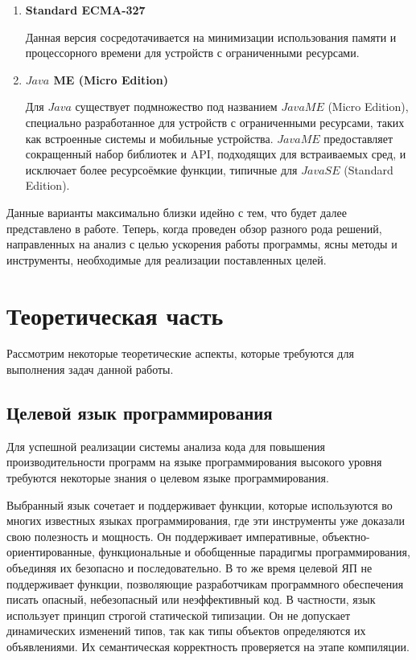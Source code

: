 \documentclass{mipt-thesis-bs}
\begin{document}
\begin{enumerate}
        \item \textbf{Standard ECMA-327}

        Данная версия сосредотачивается на минимизации использования памяти и
        процессорного времени для устройств с ограниченными ресурсами.

        \item \textbf{$Java$ ME (Micro Edition)}

        Для $Java$ существует подмножество под названием $Java ME$ (Micro Edition),
        специально разработанное для устройств с ограниченными ресурсами, таких
        как встроенные системы и мобильные устройства. $Java ME$ предоставляет
        сокращенный набор библиотек и API, подходящих для встраиваемых сред,
        и исключает более ресурсоёмкие функции, типичные для $Java SE$ (Standard Edition).
\end{enumerate}

Данные варианты максимально близки идейно с тем, что будет далее представлено в работе.
Теперь, когда проведен обзор разного рода решений, направленных на анализ с целью ускорения
работы программы, ясны методы и инструменты, необходимые для реализации поставленных целей.


\chapter{Теоретическая часть}

Рассмотрим некоторые теоретические аспекты, которые требуются для
выполнения задач данной работы.

\section{Целевой язык программирования}

Для успешной реализации системы анализа кода для повышения производительности программ на
языке программирования высокого уровня требуются некоторые знания о целевом языке программирования.

Выбранный язык сочетает и поддерживает функции, которые используются во многих известных
языках программирования, где эти инструменты уже доказали свою полезность и мощность.
Он поддерживает императивные, объектно-ориентированные, функциональные и обобщенные
 парадигмы программирования, объединяя их безопасно и последовательно.
В то же время целевой ЯП не поддерживает функции, позволяющие разработчикам
программного обеспечения писать опасный, небезопасный или неэффективный код.
В частности, язык использует принцип строгой статической типизации. Он не допускает
динамических изменений типов, так как типы объектов определяются их объявлениями.
Их семантическая корректность проверяется на этапе компиляции.
\end{document}
